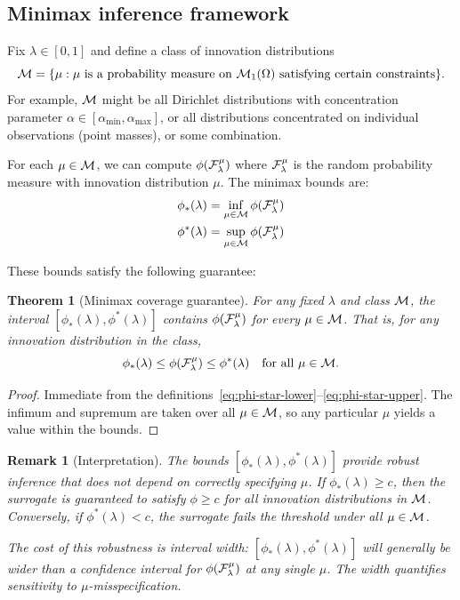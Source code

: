 \documentclass{article}
\newtheorem{remark}{Remark}
\newtheorem{theorem}{Theorem}
\begin{document}
\subsection{Minimax inference framework}

Fix $\lambda \in [0,1]$ and define a class of innovation distributions
\[
    \mathcal{M} = \{\mu : \text{$\mu$ is a probability measure on $\mathcal{M}_1(\Omega)$ satisfying certain constraints}\}.
\]
For example, $\mathcal{M}$ might be all Dirichlet distributions with concentration parameter $\alpha \in [\alpha_{\min}, \alpha_{\max}]$, or all distributions concentrated on individual observations (point masses), or some combination.

For each $\mu \in \mathcal{M}$, we can compute $\phi(\mathcal{F}_\lambda^\mu)$ where $\mathcal{F}_\lambda^\mu$ is the random probability measure with innovation distribution $\mu$. The minimax bounds are:
\begin{align}
    \phi_*(\lambda) &= \inf_{\mu \in \mathcal{M}} \phi(\mathcal{F}_\lambda^\mu) \label{eq:phi-star-lower}\\
    \phi^*(\lambda) &= \sup_{\mu \in \mathcal{M}} \phi(\mathcal{F}_\lambda^\mu) \label{eq:phi-star-upper}
\end{align}

These bounds satisfy the following guarantee:

\begin{theorem}[Minimax coverage guarantee]\label{thm:minimax}
For any fixed $\lambda$ and class $\mathcal{M}$, the interval $[\phi_*(\lambda), \phi^*(\lambda)]$ contains $\phi(\mathcal{F}_\lambda^\mu)$ for \emph{every} $\mu \in \mathcal{M}$. That is, for any innovation distribution in the class,
\[
    \phi_*(\lambda) \leq \phi(\mathcal{F}_\lambda^\mu) \leq \phi^*(\lambda) \quad \text{for all } \mu \in \mathcal{M}.
\]
\end{theorem}

\begin{proof}
Immediate from the definitions~\eqref{eq:phi-star-lower}--\eqref{eq:phi-star-upper}. The infimum and supremum are taken over all $\mu \in \mathcal{M}$, so any particular $\mu$ yields a value within the bounds.
\end{proof}

\begin{remark}[Interpretation]
The bounds $[\phi_*(\lambda), \phi^*(\lambda)]$ provide \emph{robust inference} that does not depend on correctly specifying $\mu$. If $\phi_*(\lambda) \geq c$, then the surrogate is guaranteed to satisfy $\phi \geq c$ for \emph{all} innovation distributions in $\mathcal{M}$. Conversely, if $\phi^*(\lambda) < c$, the surrogate fails the threshold under all $\mu \in \mathcal{M}$.

The cost of this robustness is interval width: $[\phi_*(\lambda), \phi^*(\lambda)]$ will generally be wider than a confidence interval for $\phi(\mathcal{F}_\lambda^\mu)$ at any single $\mu$. The width quantifies sensitivity to $\mu$-misspecification.
\end{remark}
\end{document}
